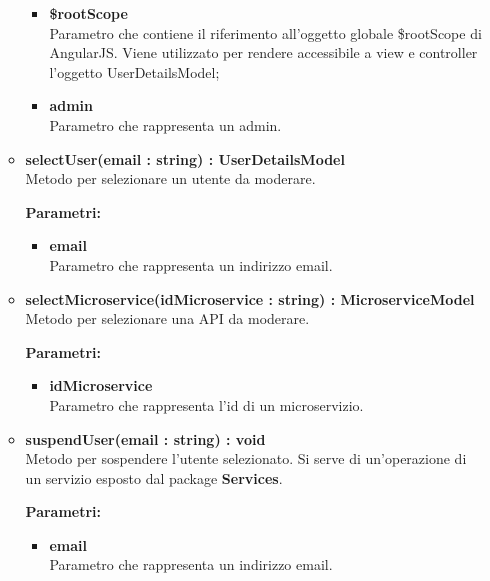 \begin{itemize}
\begin{itemize}
\begin{itemize}
				\item \textbf{\$rootScope}\\
				Parametro che contiene il riferimento all'oggetto globale \$rootScope di AngularJS. Viene utilizzato per rendere accessibile a view e controller l'oggetto UserDetailsModel;
				
				\item \textbf{admin}\\
				Parametro che rappresenta un admin.
			\end{itemize}
			
			\item \textbf{selectUser(email : string) : UserDetailsModel}\\
			Metodo per selezionare un utente da moderare.
			\begin{description}
    			\item[\textbf{Parametri:}]
			\end{description}
			\begin{itemize}
				\item \textbf{email}\\
				Parametro che rappresenta un indirizzo email.
			\end{itemize}
			
			\item \textbf{selectMicroservice(idMicroservice : string) : MicroserviceModel}\\
			Metodo per selezionare una API da moderare.
			\begin{description}
    			\item[\textbf{Parametri:}]
			\end{description}
			\begin{itemize}
				\item \textbf{idMicroservice}\\
				Parametro che rappresenta l'id di un microservizio.
			\end{itemize}
			
			\item \textbf{suspendUser(email : string) : void}\\
			Metodo per sospendere l'utente selezionato. Si serve di un'operazione di un servizio esposto dal package \textbf{Services}.
			\begin{description}
    			\item[\textbf{Parametri:}]
			\end{description}
			\begin{itemize}
				\item \textbf{email}\\
				Parametro che rappresenta un indirizzo email.
			\end{itemize}
			

\end{itemize}
\end{itemize}

